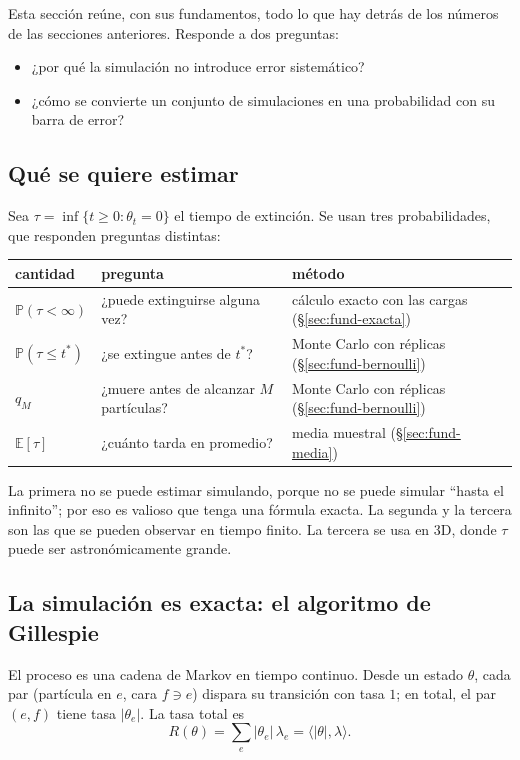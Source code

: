 \documentclass[11pt,a4paper]{article}
\theoremstyle{plain}
\theoremstyle{remark}
\newcommand{\ip}[2]{\langle #1,#2\rangle}
\begin{document}
Esta sección reúne, con sus fundamentos, todo lo que hay detrás de los números de las secciones anteriores. Responde a dos preguntas:
\begin{itemize}[nosep]
  \item ¿por qué la simulación no introduce error sistemático?
  \item ¿cómo se convierte un conjunto de simulaciones en una probabilidad con su barra de error?
\end{itemize}

\subsection{Qué se quiere estimar}

Sea $\tau=\inf\{t\ge0:\theta_t=0\}$ el tiempo de extinción. Se usan tres probabilidades, que responden preguntas distintas:

\begin{center}
\small
\begin{tabular}{@{}lll@{}}
\toprule
cantidad & pregunta & método \\
\midrule
$\mathbb{P}(\tau<\infty)$ & ¿puede extinguirse alguna vez? & cálculo exacto con las cargas (\S\ref{sec:fund-exacta}) \\
$\mathbb{P}(\tau\le t^\ast)$ & ¿se extingue antes de $t^\ast$? & Monte Carlo con réplicas (\S\ref{sec:fund-bernoulli}) \\
$q_M$ & ¿muere antes de alcanzar $M$ partículas? & Monte Carlo con réplicas (\S\ref{sec:fund-bernoulli}) \\
$\mathbb{E}[\tau]$ & ¿cuánto tarda en promedio? & media muestral (\S\ref{sec:fund-media}) \\
\bottomrule
\end{tabular}
\end{center}

\noindent La primera no se puede estimar simulando, porque no se puede simular ``hasta el infinito''; por eso es valioso que tenga una fórmula exacta. La segunda y la tercera son las que se pueden observar en tiempo finito. La tercera se usa en 3D, donde $\tau$ puede ser astronómicamente grande.

\subsection{La simulación es exacta: el algoritmo de Gillespie}\label{sec:fund-gillespie}

El proceso es una cadena de Markov en tiempo continuo. Desde un estado $\theta$, cada par (partícula en $e$, cara $f\ni e$) dispara su transición con tasa $1$; en total, el par $(e,f)$ tiene tasa $|\theta_e|$. La tasa total es
\[
R(\theta)=\sum_e|\theta_e|\,\lambda_e=\ip{|\theta|}{\lambda}.
\]
\end{document}
